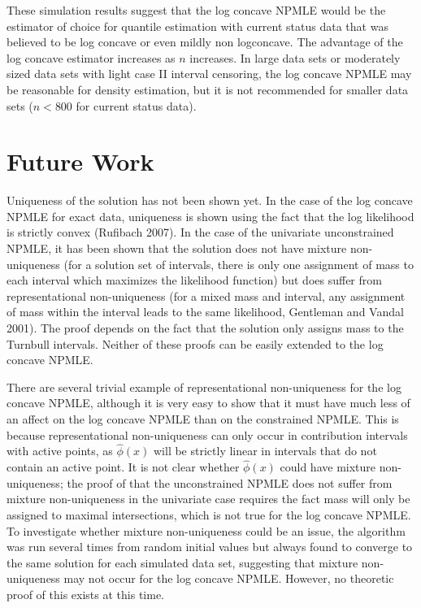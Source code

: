 \documentclass[12pt]{article}
\numberwithin{equation}{section}
\begin{document}
	These simulation results suggest that the log concave NPMLE would be the estimator of choice for quantile estimation with current status data that was believed to be log concave or even mildly non logconcave. The advantage of the log concave estimator increases as $n$ increases. In large data sets or moderately sized data sets with light case II interval censoring, the log concave NPMLE may be reasonable for density estimation, but it is not recommended for smaller data sets ($n < 800$ for current status data).
	
	{\section{Future Work} } 

	Uniqueness of the solution has not been shown yet. In the case of the log concave NPMLE for exact data, uniqueness is shown using the fact that the log likelihood is strictly convex (Rufibach 2007). In the case of the univariate unconstrained NPMLE, it has been shown that the solution does not have mixture non-uniqueness (for a solution set of intervals, there is only one assignment of mass to each interval which maximizes the likelihood function) but does suffer from representational non-uniqueness (for a mixed mass and interval, any assignment of mass within the interval leads to the same likelihood, Gentleman and Vandal 2001). The proof depends on the fact that the solution only assigns mass to the Turnbull intervals. Neither of these proofs can be easily extended to the log concave NPMLE. 
	
	There are several trivial example of representational non-uniqueness for the log concave NPMLE, although it is very easy to show that it must have much less of an affect on the log concave NPMLE than on the constrained NPMLE. This is because representational non-uniqueness can only occur in contribution intervals with active points, as $\hat \phi(x)$ will be strictly linear in intervals that do not contain an active point. It is not clear whether $\hat \phi(x)$ could have mixture non-uniqueness; the proof of that the unconstrained NPMLE does not suffer from mixture non-uniqueness in the univariate case requires the fact mass will only be assigned to maximal intersections, which is not true for the log concave NPMLE. To investigate whether mixture non-uniqueness could be an issue, the algorithm was run several times from random initial values but always found to converge to the same solution for each simulated data set, suggesting that mixture non-uniqueness may not occur for the log concave NPMLE. However, no theoretic proof of this exists at this time.
	
\end{document}
